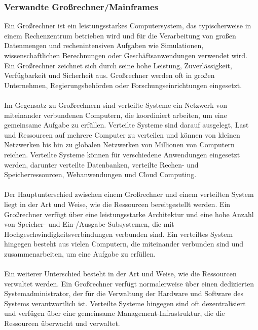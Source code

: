 \documentclass[../vs-script-first-v01.tex]{subfiles}
\begin{document}
\subsubsection{Verwandte Großrechner/Mainframes}
Ein Großrechner ist ein leistungsstarkes Computersystem, das typischerweise in einem Rechenzentrum betrieben wird und für die Verarbeitung von großen Datenmengen und rechenintensiven Aufgaben wie Simulationen, wissenschaftlichen Berechnungen oder Geschäftsanwendungen verwendet wird. Ein Großrechner zeichnet sich durch seine hohe Leistung, Zuverlässigkeit, Verfügbarkeit und Sicherheit aus. Großrechner werden oft in großen Unternehmen, Regierungsbehörden oder Forschungseinrichtungen eingesetzt.
\\\\
Im Gegensatz zu Großrechnern sind verteilte Systeme ein Netzwerk von miteinander verbundenen Computern, die koordiniert arbeiten, um eine gemeinsame Aufgabe zu erfüllen. Verteilte Systeme sind darauf ausgelegt, Last und Ressourcen auf mehrere Computer zu verteilen und können von kleinen Netzwerken bis hin zu globalen Netzwerken von Millionen von Computern reichen. Verteilte Systeme können für verschiedene Anwendungen eingesetzt werden, darunter verteilte Datenbanken, verteilte Rechen- und Speicherressourcen, Webanwendungen und Cloud Computing.
\\\\
Der Hauptunterschied zwischen einem Großrechner und einem verteilten System liegt in der Art und Weise, wie die Ressourcen bereitgestellt werden. Ein Großrechner verfügt über eine leistungsstarke Architektur und eine hohe Anzahl von Speicher- und Ein-/Ausgabe-Subsystemen, die mit Hochgeschwindigkeitsverbindungen verbunden sind. Ein verteiltes System hingegen besteht aus vielen Computern, die miteinander verbunden sind und zusammenarbeiten, um eine Aufgabe zu erfüllen.
\\\\
Ein weiterer Unterschied besteht in der Art und Weise, wie die Ressourcen verwaltet werden. Ein Großrechner verfügt normalerweise über einen dedizierten Systemadministrator, der für die Verwaltung der Hardware und Software des Systems verantwortlich ist. Verteilte Systeme hingegen sind oft dezentralisiert und verfügen über eine gemeinsame Management-Infrastruktur, die die Ressourcen überwacht und verwaltet.
\end{document}
